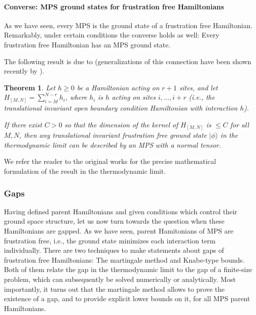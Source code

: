 \documentclass[rmp,aps,reprint,superscriptaddress,nobalancelastpage]{revtex4-1}
\newtheorem{thm}{Theorem}[section]
\newcommand{\ket}[1]{\vert#1\rangle}
\begin{document}
    \paragraph{Converse: MPS ground states for frustration free Hamiltonians}

    As we have seen, every MPS is the ground state of a frustration free Hamiltonian. Remarkably, under certain conditions the converse holds as well: Every frustration free Hamiltonian has an MPS ground state.

    The following result is due to \textcite{matsui:gapped-ham-vs-mps}
    (generalizations of this connection have been shown recently by
    \textcite{ogata:gapped-ham-vs-mps-I,ogata:gapped-ham-vs-mps-II,ogata:gapped-ham-vs-mps-III}).

    \begin{thm}
        Let $h\ge0$ be a Hamiltonian acting on $r+1$ sites, and let
        $H_{[M,N]}=\sum_{i=M}^{N-r} h_i$, where $h_i$ is $h$ acting on sites $i,\dots,i+r$ (i.e., the translational invariant open boundary condition Hamiltonian with interaction $h$).

        If there exist $C>0$ so that the dimension of the kernel of $H_{[M,N]}$ is $\le C$ for all $M,N$, then any translational invariant frustration free ground state $\ket\phi$ in the thermodynamic limit can be described by an MPS with a normal tensor.
    \end{thm}
    We refer the reader to the original works for the precise mathematical formulation of the result in the thermodynamic limit.



    \subsubsection{Gaps\label{sec:4:hams-gaps}}

    Having defined parent Hamiltonians and given conditions which control their ground space structure, let us now turn towards the question when these Hamiltonians are gapped.  As we have seen, parent Hamitonians of MPS are frustration free, i.e., the ground state minimizes each interaction term individually.  There are two techniques to make statements about gaps of frustration free Hamiltonians: The martingale method and Knabe-type bounds. Both of them relate the gap in the thermodynamic limit to the gap of a finite-size problem, which can subsequently be solved numerically or analytically.  Most importantly, it turns out that the martingale method allows to prove the existence of a gap, and to provide explicit lower bounds on it, for all MPS parent Hamiltonians.
\end{document}
